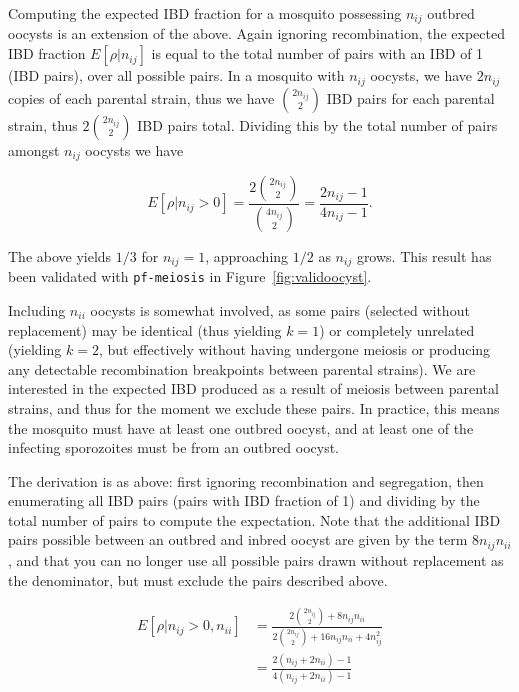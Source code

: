 \documentclass[9pt,lineno]{elife}
\begin{document}
\begin{appendixbox}
Computing the expected IBD fraction for a mosquito possessing $n_{ij}$ outbred oocysts is an extension of the above. Again ignoring recombination, the expected IBD fraction $E[\rho|n_{ij}]$ is equal to the total number of pairs with an IBD of 1 (IBD pairs), over all possible pairs. In a mosquito with $n_{ij}$ oocysts, we have $2n_{ij}$ copies of each parental strain, thus we have ${2n_{ij} \choose 2}$ IBD pairs for each parental strain, thus $2 {2n_{ij} \choose 2}$ IBD pairs total. Dividing this by the total number of pairs amongst $n_{ij}$ oocysts we have

\begin{equation} \label{eq1}
E[\rho|n_{ij} > 0] = \frac{2{2n_{ij} \choose 2}}{{4n_{ij} \choose 2}} = \frac{2n_{ij} - 1}{4n_{ij} - 1}.
\end{equation}

The above yields $1/3$ for $n_{ij}=1$, approaching $1/2$ as $n_{ij}$ grows. This result has been validated with \texttt{pf-meiosis} in Figure~\ref{fig:validoocyst}.

Including $n_{ii}$ oocysts is somewhat involved, as some pairs (selected without replacement) may be identical (thus yielding $k=1$) or completely unrelated (yielding $k=2$, but effectively without having undergone meiosis or producing any detectable recombination breakpoints between parental strains).  We are interested in the expected IBD produced as a result of meiosis between parental strains, and thus for the moment we exclude these pairs. In practice, this means the mosquito must have at least one outbred oocyst, and at least one of the infecting sporozoites must be from an outbred oocyst.

The derivation is as above: first ignoring recombination and segregation, then enumerating all IBD pairs (pairs with IBD fraction of 1) and dividing by the total number of pairs to compute the expectation. Note that the additional IBD pairs possible between an outbred and inbred oocyst are given by the term $8n_{ij}n_{ii}$, and that you can no longer use all possible pairs drawn without replacement as the denominator, but must exclude the pairs described above.

\begin{align}
E[\rho|n_{ij} > 0, n_{ii}] & = \frac{2{2n_{ij} \choose 2} + 8n_{ij}n_{ii}}{2{2n_{ij} \choose 2} + 16n_{ij}n_{ii} + 4n_{ij}^2} \nonumber\\
& = \frac{2(n_{ij} + 2n_{ii}) - 1}{4(n_{ij} + 2n_{ii}) - 1}  \label{eq2}
\end{align}



\end{appendixbox}
\end{document}
